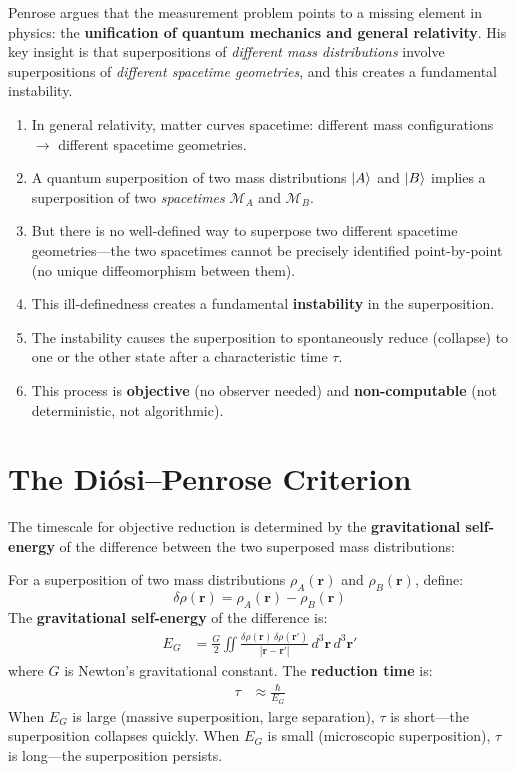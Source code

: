 \documentclass[11pt,a4paper]{report}
\begin{document}
Penrose argues that the measurement problem points to a missing element in physics: the \textbf{unification of quantum mechanics and general relativity}. His key insight is that superpositions of \emph{different mass distributions} involve superpositions of \emph{different spacetime geometries}, and this creates a fundamental instability.

\begin{principlebox}
\begin{enumerate}[leftmargin=1.5em]
  \item In general relativity, matter curves spacetime: different mass configurations $\to$ different spacetime geometries.
  \item A quantum superposition of two mass distributions $\ket{A}$ and $\ket{B}$ implies a superposition of two \emph{spacetimes} $\mathcal{M}_A$ and $\mathcal{M}_B$.
  \item But there is no well-defined way to superpose two different spacetime geometries---the two spacetimes cannot be precisely identified point-by-point (no unique diffeomorphism between them).
  \item This ill-definedness creates a fundamental \textbf{instability} in the superposition.
  \item The instability causes the superposition to spontaneously reduce (collapse) to one or the other state after a characteristic time $\tau$.
  \item This process is \textbf{objective} (no observer needed) and \textbf{non-computable} (not deterministic, not algorithmic).
\end{enumerate}
\end{principlebox}

\section{The Di\'osi--Penrose Criterion}

The timescale for objective reduction is determined by the \textbf{gravitational self-energy} of the difference between the two superposed mass distributions:

\begin{quantbox}
For a superposition of two mass distributions $\rho_A(\mathbf{r})$ and $\rho_B(\mathbf{r})$, define:
\[
  \delta\rho(\mathbf{r}) = \rho_A(\mathbf{r}) - \rho_B(\mathbf{r})
\]
The \textbf{gravitational self-energy} of the difference is:
\begin{align}
  E_G &= \frac{G}{2} \iint \frac{\delta\rho(\mathbf{r})\, \delta\rho(\mathbf{r}')}{|\mathbf{r} - \mathbf{r}'|}\, d^3\mathbf{r}\, d^3\mathbf{r}' \label{eq:EG}
\end{align}
where $G$ is Newton's gravitational constant. The \textbf{reduction time} is:
\begin{align}
  \tau &\approx \frac{\hbar}{E_G} \label{eq:tau}
\end{align}
When $E_G$ is large (massive superposition, large separation), $\tau$ is short---the superposition collapses quickly. When $E_G$ is small (microscopic superposition), $\tau$ is long---the superposition persists.
\end{quantbox}
\end{document}
